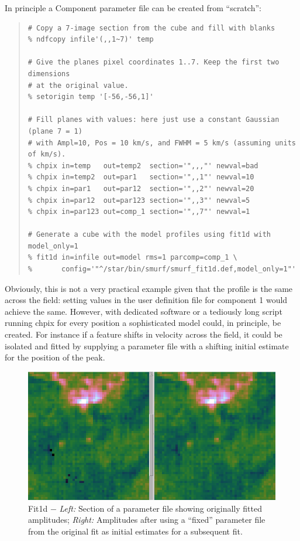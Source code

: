 \documentclass[twoside,11pt]{article}
\renewcommand{\_}{\texttt{\symbol{95}}}
\newenvironment{myquote}{\begin{quote}\begin{small}}{\end{small}\end{quote}}
\begin{document}
In principle a Component parameter file can be created from ``scratch'':
\begin{myquote}
\begin{verbatim}
# Copy a 7-image section from the cube and fill with blanks
% ndfcopy infile'(,,1~7)' temp

# Give the planes pixel coordinates 1..7. Keep the first two dimensions
# at the original value.
% setorigin temp '[-56,-56,1]'

# Fill planes with values: here just use a constant Gaussian (plane 7 = 1)
# with Ampl=10, Pos = 10 km/s, and FWHM = 5 km/s (assuming units of km/s).
% chpix in=temp   out=temp2  section='",,,"' newval=bad
% chpix in=temp2  out=par1   section='",,1"' newval=10
% chpix in=par1   out=par12  section='",,2"' newval=20
% chpix in=par12  out=par123 section='",,3"' newval=5
% chpix in=par123 out=comp_1 section='",,7"' newval=1

# Generate a cube with the model profiles using fit1d with model_only=1
% fit1d in=infile out=model rms=1 parcomp=comp_1 \
%       config='"^/star/bin/smurf/smurf_fit1d.def,model_only=1"'
\end{verbatim}
\end{myquote}

Obviously, this is not a very practical example given that the profile
is the same across the field: setting values in the user definition
file for component 1 would achieve the same. However, with dedicated
software or a tediously long script running chpix for every position a
sophisticated model could, in principle, be created. For instance if a
feature shifts in velocity across the field, it could be isolated and
fitted by supplying a parameter file with a shifting initial estimate
for the position of the peak.

\begin{figure}[htb]
  \begin{center}
    \includegraphics[width=0.8\linewidth]{sun258_fit1d_fixfit}
    \caption{Fit1d $-$  {\it Left:} Section of a parameter file showing
      originally fitted amplitudes; {\it Right:} Amplitudes after using a
      ``fixed'' parameter file from the original fit as initial estimates
      for a subsequent fit.}
    \label{fig:fixfit}
  \end{center}
\end{figure}
\end{document}
